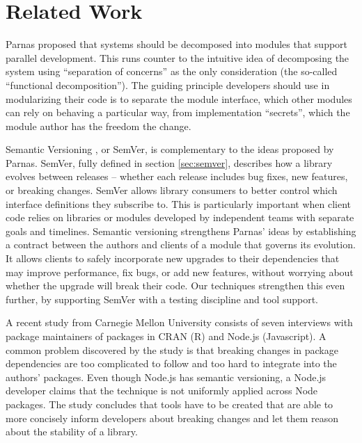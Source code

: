 \section{Related Work}

Parnas proposed \cite{Parnas} that systems should be decomposed into
modules that support parallel development. This runs counter to the
intuitive idea of decomposing the system using ``separation of
concerns'' as the only consideration (the so-called ``functional
decomposition''). The guiding principle developers should use in
modularizing their code is to separate the module interface, which
other modules can rely on behaving a particular way, from
implementation ``secrets'', which the module author has the freedom
the change. 

Semantic Versioning \cite{semver}, or SemVer, is complementary to the ideas
proposed by Parnas.
%
SemVer, fully defined in section \ref{sec:semver}, describes how a
library evolves between releases -- whether each release includes bug
fixes, new features, or breaking changes.
%
SemVer allows library consumers to better control which interface
definitions they subscribe to. This is particularly important when
client code relies on libraries or modules developed by independent
teams with separate goals and timelines.
%
Semantic versioning strengthens Parnas' ideas by establishing a
contract between the authors and clients of a module that governs its
evolution.
%
It allows clients to safely incorporate new upgrades to their
dependencies that may improve performance, fix bugs, or add new
features, without worrying about whether the upgrade will break their
code.
%
Our techniques strengthen this even further, by supporting SemVer with
a testing discipline and tool support.

A recent study from Carnegie Mellon University \cite{bogart15-break}
consists of seven interviews with package maintainers of packages in
CRAN (R) and Node.js (Javascript). A common problem discovered by the
study is that breaking changes in package dependencies are too
complicated to follow and too hard to integrate into the authors'
packages. Even though Node.js has semantic versioning, a Node.js
developer claims that the technique is not uniformly applied across
Node packages. The study concludes that tools have to be created that
are able to more concisely inform developers about breaking changes
and let them reason about the stability of a library.

